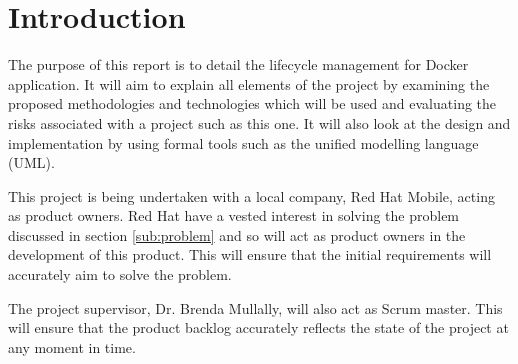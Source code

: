 \section{Introduction}
The purpose of this report is to detail the \gls{lifecycle management} for Docker application. It will aim to explain all elements of the project by examining the proposed methodologies and technologies which will be used and evaluating the risks associated with a project such as this one. It will also look at the design and implementation by using formal tools such as the unified modelling language (UML).

This project is being undertaken with a local company, Red Hat Mobile, acting as product owners. Red Hat have a vested interest in solving the problem discussed in section \ref{sub:problem} and so will act as product owners in the development of this product. This will ensure that the initial requirements will accurately aim to solve the problem. 

The project supervisor, Dr. Brenda Mullally, will also act as Scrum master. This will ensure that the product backlog accurately reflects the state of the project at any moment in time. 

